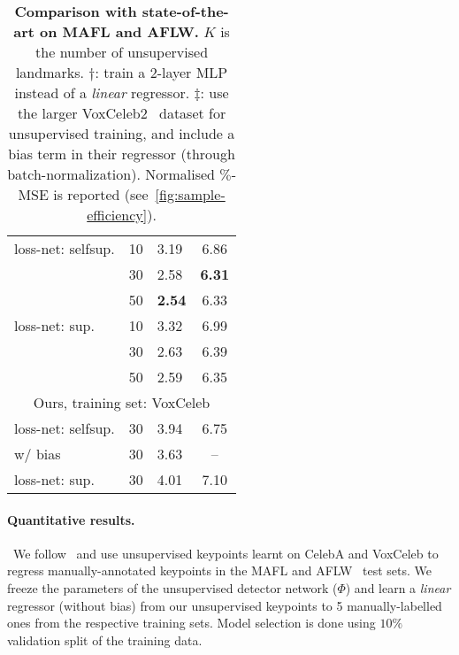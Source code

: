 \documentclass{article}
\begin{document}
\begin{wraptable}{r}{5.9cm}
\begin{tabular}{@{}lllc@{}}
loss-net: selfsup.                            & 10   & 3.19       & 6.86                     \\
                                              & 30   & 2.58       & {\bf 6.31}               \\
                                              & 50   & {\bf 2.54} & 6.33                     \\
loss-net: sup.                                & 10   & 3.32       & 6.99                     \\
                                              & 30   & 2.63       & 6.39                     \\
                                              & 50   & 2.59       & 6.35                     \\ \midrule
\multicolumn{4}{c}{Ours, training set: VoxCeleb}                                             \\
loss-net: selfsup.                            & 30   & 3.94       & {6.75}                     \\
\quad w/ bias                                 & 30   & 3.63       & {--}                     \\
loss-net: sup.                                & 30   & 4.01       & 7.10                     \\ \bottomrule
\end{tabular}
\caption{{\bf Comparison with state-of-the-art on MAFL and AFLW.} $K$ is the number of unsupervised landmarks. $\dagger$: train a 2-layer MLP instead of a \emph{linear} regressor. $\ddagger$: use the larger VoxCeleb2~\cite{Chung18a} dataset for unsupervised training, and include a bias term in their regressor (through batch-normalization). Normalised $\%$-MSE is reported (see~\cref{fig:sample-efficiency}).}\label{tab:face-sota}
\vspace{-9mm}
\end{wraptable}\paragraph{Quantitative results.}~We follow~\citep{thewlis17unsupervised,thewlis17Bunsupervised} and use unsupervised keypoints learnt on CelebA and VoxCeleb to regress manually-annotated keypoints in the MAFL and AFLW~\cite{AFLW} test sets.
We freeze the parameters of the unsupervised detector network ($\Phi$) and learn a \emph{linear} regressor (without bias) from our unsupervised keypoints to 5 manually-labelled ones from the respective training sets. Model selection is done using $10\%$ validation split of the training data.
\end{document}
